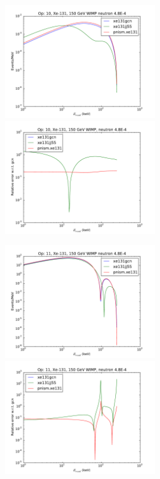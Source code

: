 \documentclass{article}
\begin{document}
\includegraphics[width=0.5\textwidth]{xe131-o10}
\includegraphics[width=0.5\textwidth]{xe131-o10-relerr}

\includegraphics[width=0.5\textwidth]{xe131-o11}
\includegraphics[width=0.5\textwidth]{xe131-o11-relerr}
\end{document}
